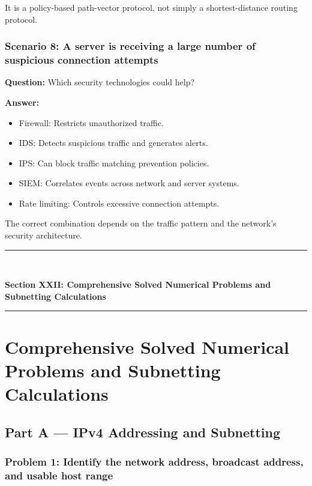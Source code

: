 It is a policy-based path-vector protocol, not simply a shortest-distance routing protocol.

\subsubsection*{Scenario 8: A server is receiving a large number of suspicious connection attempts}

\textbf{Question:} Which security technologies could help?

\textbf{Answer:}

\begin{itemize}
\item Firewall: Restricts unauthorized traffic.
\item IDS: Detects suspicious traffic and generates alerts.
\item IPS: Can block traffic matching prevention policies.
\item SIEM: Correlates events across network and server systems.
\item Rate limiting: Controls excessive connection attempts.
\end{itemize}

The correct combination depends on the traffic pattern and the network's security architecture.



\newpage
\begin{center}
\vspace{0.5em}
{\color{primary}\rule{0.45\textwidth}{1.2pt}\\[4pt]}
{\Large\bfseries\color{primary} Section XXII: Comprehensive Solved Numerical Problems and Subnetting Calculations\\[2pt]}
{\color{primary}\rule{0.45\textwidth}{1.2pt}}
\vspace{0.5em}
\end{center}

\section{Comprehensive Solved Numerical Problems and Subnetting Calculations}

\subsection{Part A --- IPv4 Addressing and Subnetting}
\subsubsection*{Problem 1: Identify the network address, broadcast address, and usable host range}

